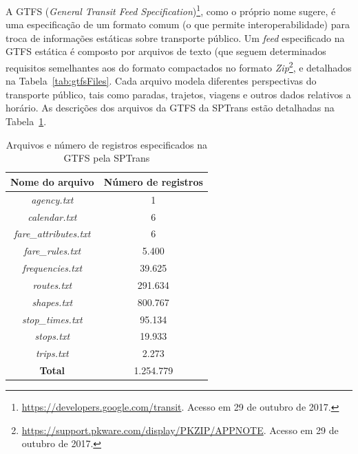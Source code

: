 \documentclass[
	12pt,				%
	oneside,			%
	a4paper,			%
	english,			%
	brazil				%
	]{abntex2ppgsi}
\begin{document}
{{{A GTFS (\textit{General Transit Feed Specification})\footnote{\label{googleTransit}\url{https://developers.google.com/transit}. Acesso em 29 de outubro de 2017.}, como o próprio nome sugere, é uma especificação de um formato comum (o que permite interoperabilidade) para troca de informações estáticas sobre transporte público.  Um \textit{feed} especificado na GTFS estática é composto por arquivos de texto (que seguem determinados requisitos semelhantes aos do formato   compactados no formato \textit{Zip}\footnote{\url{https://support.pkware.com/display/PKZIP/APPNOTE}. Acesso em 29 de outubro de 2017.}, e detalhados na Tabela~\ref{tab:gtfsFiles}. Cada arquivo modela diferentes perspectivas do transporte público, tais como paradas, trajetos, viagens e outros dados relativos a horário. As descrições dos arquivos da GTFS da SPTrans estão detalhadas na Tabela~\ref{tab:gtfs}.


\begin{table}[!htb]
\centering
\caption{Arquivos e número de registros especificados na GTFS pela SPTrans}
	\label{tab:gtfs}
\begin{tabular}{c|c}
\toprule
\textbf{Nome do arquivo} & \textbf{Número de registros} \\ 
\midrule
\textit{agency.txt} & 1 \\ 
\hline
\textit{calendar.txt} & 6 \\ 
\hline
\textit{fare\_attributes.txt} & 6 \\ 
\hline
\textit{fare\_rules.txt} & 5.400 \\
\hline
\textit{frequencies.txt} & 39.625 \\
\hline
\textit{routes.txt} & 291.634 \\
\hline
\textit{shapes.txt} & 800.767 \\
\hline
\textit{stop\_times.txt} & 95.134 \\  
\hline
\textit{stops.txt} & 19.933 \\ 
\hline
\textit{trips.txt} & 2.273 \\
\midrule
\midrule
\textbf{Total} & 1.254.779 \\
\bottomrule
\end{tabular}
\end{table}

}}}
\end{document}
